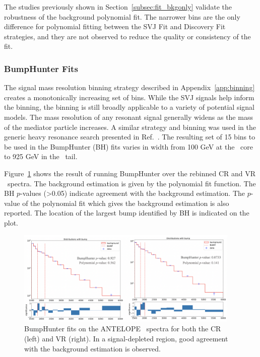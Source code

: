 The studies previously shown in Section~\ref{subsec:fit_bkgonly} validate the robustness of the background polynomial fit. 
The narrower bins are the only difference for polynomial fitting between the SVJ Fit and Discovery Fit strategies, and they are not observed to reduce the quality or consistency of the fit. 

\subsubsection{BumpHunter Fits}
\label{subsec:bhfits}

The signal mass resolution binning strategy described in Appendix~\ref{app:binning} creates a monotonically increasing set of bins. 
While the SVJ signals help inform the binning, the binning is still broadly applicable to a variety of potential signal models.
The mass resolution of any resonant signal generally widens as the mass of the mediator particle increases.
A similar strategy and binning was used in the generic heavy resonance search presented in Ref.~\cite{yxh}.
The resulting set of 15 bins to be used in the BumpHunter (BH) fits varies in width from 100 GeV at the \mt~core to 925 GeV in the \mt~tail. 

Figure~\ref{fig:antelope_bh_crvr} shows the result of running BumpHunter over the rebinned CR and VR \mt~spectra.
The background estimation is given by the polynomial fit function. 
The BH $p$-values (>0.05) indicate agreement with the background estimation.
The $p$-value of the polynomial fit which gives the background estimation is also reported.
The location of the largest bump identified by BH is indicated on the plot. 
\begin{figure}[!htbp]
\centering
   \includegraphics[width=0.95\textwidth]{figures/stats/antelope_bh_crvr}
    \caption{BumpHunter fits on the ANTELOPE \mt~spectra for both the CR (left) and VR (right). In a signal-depleted region, good agreement with the background estimation is observed.
    \label{fig:antelope_bh_crvr}}
\end{figure}

